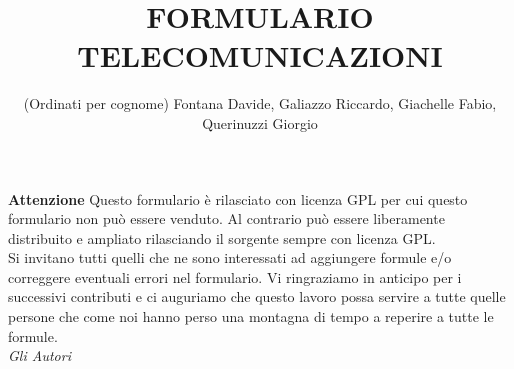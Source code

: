 \documentclass[a4paper]{article}
\begin{document}
\title{FORMULARIO TELECOMUNICAZIONI}
\author{(Ordinati per cognome) Fontana Davide, Galiazzo Riccardo, Giachelle Fabio, Querinuzzi Giorgio }
\maketitle
\textbf{Attenzione}
Questo formulario è rilasciato con licenza GPL per cui questo formulario non 
può essere venduto. Al contrario può essere liberamente distribuito e ampliato 
rilasciando il sorgente sempre con licenza GPL\@. \\
Si invitano tutti quelli che ne sono interessati ad aggiungere formule 
e/o correggere eventuali errori nel formulario.
Vi ringraziamo in anticipo per i successivi contributi e ci auguriamo
che questo lavoro possa servire a tutte quelle persone che come noi hanno 
perso una montagna di tempo a reperire a tutte le formule.\\
\textit{Gli Autori}
\newpage
\end{document}
